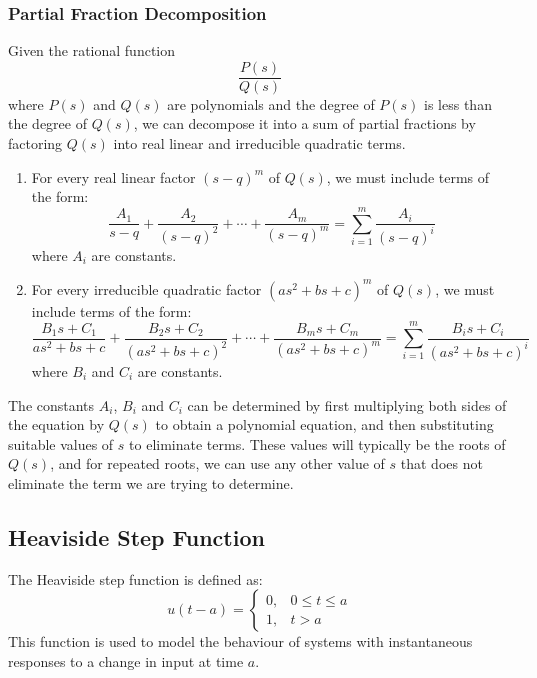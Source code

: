 \documentclass{article}
\begin{document}
\subsubsection{Partial Fraction Decomposition}
Given the rational function
\begin{equation*}
    \frac{P\left( s \right)}{Q\left( s \right)}
\end{equation*}
where \(P\left( s \right)\) and \(Q\left( s \right)\) are polynomials
and the degree of \(P\left( s \right)\) is less than the degree of
\(Q\left( s \right)\), we can decompose it into a sum of
partial fractions by factoring \(Q\left( s \right)\) into real linear
and irreducible quadratic terms.
\begin{enumerate}
    \item For every real linear factor \(\left( s - q \right)^m\) of
          \(Q\left( s \right)\), we must include terms of the form:
          \begin{equation*}
              \frac{A_1}{s - q} + \frac{A_2}{\left( s - q \right)^2} + \cdots + \frac{A_m}{\left( s - q \right)^m} =
              \sum_{i=1}^m \frac{A_i}{\left( s - q \right)^i}
          \end{equation*}
          where \(A_i\) are constants.
    \item For every irreducible quadratic factor \(\left( a s^2 + bs +
          c \right)^m\) of \(Q\left( s \right)\), we must include terms
          of the form:
          \begin{equation*}
              \frac{B_1 s + C_1}{a s^2 + b s + c} + \frac{B_2 s + C_2}{\left( a s^2 + b s + c \right)^2} + \cdots + \frac{B_m s + C_m}{\left( a s^2 + b s + c \right)^m} =
              \sum_{i=1}^m \frac{B_i s + C_i}{\left( a s^2 + b s + c \right)^i}
          \end{equation*}
          where \(B_i\) and \(C_i\) are constants.
\end{enumerate}
The constants \(A_i\), \(B_i\) and \(C_i\) can be determined by first
multiplying both sides of the equation by \(Q\left( s \right)\) to
obtain a polynomial equation, and then substituting suitable values of
\(s\) to eliminate terms. These values will typically be the roots of
\(Q\left( s \right)\), and for repeated roots, we can use any other
value of \(s\) that does not eliminate the term we are trying to
determine.
\subsection{Heaviside Step Function}
The Heaviside step function is defined as:
\begin{equation*}
    u\left( t - a \right) =
    \begin{cases}
        0, & 0 \leqslant t \leqslant a \\
        1, & t > a
    \end{cases}
\end{equation*}
This function is used to model the behaviour of systems
with instantaneous responses to a change in input at time \(a\).
\end{document}
